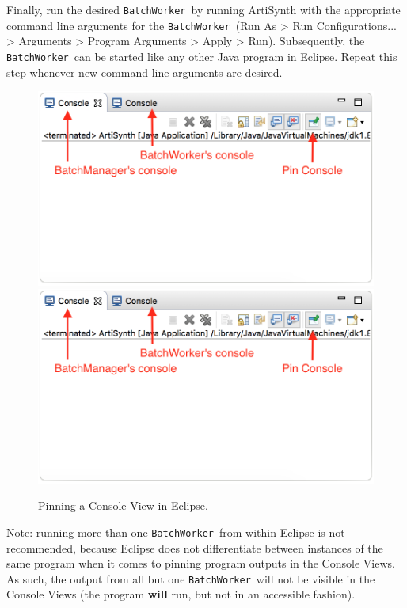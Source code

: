\documentclass{article}
\newcommand{\BW}{{\tt BatchWorker}}
\begin{document}
Finally, run the desired \BW\ by running ArtiSynth with the appropriate command line arguments for the \BW\ ({\sf Run As > Run Configurations... > Arguments > Program Arguments > Apply > Run}). Subsequently, the \BW\ can be started like any other Java program in Eclipse. Repeat this step whenever new command line arguments are desired.

\begin{figure}[t]
\begin{center}
\iflatexml
 \includegraphics[]{images/batch-worker-launch-2}
\else
 \includegraphics[width=6in]{images/batch-worker-launch-2}
\fi
\end{center}
\caption{Pinning a Console View in Eclipse.}
\label{fig:pin-console}
\end{figure}

\begin{sideblock}
Note: running more than one \BW\ from within Eclipse is not recommended, because Eclipse does not differentiate between instances of the same program when it comes to pinning program outputs in the Console Views. As such, the output from all but one \BW\ will not be visible in the Console Views (the program \textbf{will} run, but not in an accessible fashion). 
\end{sideblock}
\end{document}
